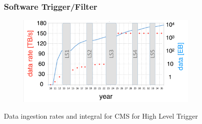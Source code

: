 \begin{frame}
\frametitle{Software Trigger/Filter}

\begin{figure}[htbp]
\begin{center}
\includegraphics[width=0.8\textwidth]{images/lhc-big-data-plot.png}
\end{center}
\end{figure}

\small{Data ingestion rates and integral for CMS for High Level Trigger}

\end{frame}


